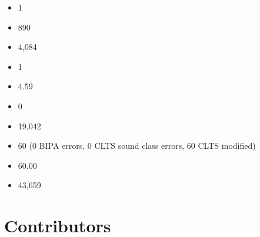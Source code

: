\documentclass[letterpaper,10pt,english]{sphinxmanual}
\begin{document}
\begin{itemize}
\item {} 
\sphinxAtStartPar
{} 1

\item {} 
\sphinxAtStartPar
{} 890

\item {} 
\sphinxAtStartPar
{} 4,084

\item {} 
\sphinxAtStartPar
{} 1

\item {} 
\sphinxAtStartPar
{} 4.59

\item {} 
\sphinxAtStartPar
{} 0

\item {} 
\sphinxAtStartPar
{} 19,042

\item {} 
\sphinxAtStartPar
{} 60 (0 BIPA errors, 0 CLTS sound class errors, 60 CLTS
modified)

\item {} 
\sphinxAtStartPar
{} 60.00

\item {} 
\sphinxAtStartPar
{} 43,659

\end{itemize}


\section{Contributors}
\label{\detokenize{home:contributors}}
\end{document}
